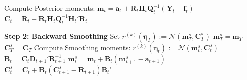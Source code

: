 \begin{algorithm}
\begin{algorithmic}
    \State Compute Posterior moments:
    \State $\mathbf{m}_t = \mathbf{a}_t + \mathbf{R}_t \mathbf{H}_t \mathbf{Q}_t^{-1}(\mathbf{Y}_t - \mathbf{f}_t)$
    \State $\mathbf{C}_t = \mathbf{R}_t - \mathbf{R}_t \mathbf{H}_t \mathbf{Q}_t^{-1} \mathbf{H}_t' \mathbf{R}_t$
\EndFor

\State \textbf{Step 2: Backward Smoothing}
        \State Set $r^{(k)}(\boldsymbol{\eta}_T) := \mathcal{N}(\mathbf{m}_T^s, \mathbf{C}_T^s)$
        \State $\mathbf{m}_T^s = \mathbf{m}_T$
        \State $\mathbf{C}_T^s = \mathbf{C}_T$
    \Else
        \State Compute Smoothing moments:
        \State $r^{(k)}(\boldsymbol{\eta}_t) := \mathcal{N}(\mathbf{m}_t^s, \mathbf{C}_t^s)$
        \State $\mathbf{B}_t = \mathbf{C}_t \mathbf{D}_{t+1}' \mathbf{R}_{t+1}^{-1}$
        \State $\mathbf{m}_t^s = \mathbf{m}_t + \mathbf{B}_t (\mathbf{m}_{t+1}^s - \mathbf{a}_{t+1})$
        \State $\mathbf{C}_t^s = \mathbf{C}_t + \mathbf{B}_t (\mathbf{C}_{t+1}^s - \mathbf{R}_{t+1}) \mathbf{B}_t'$
    \EndIf
\EndFor


\end{algorithmic}
\end{algorithm}
